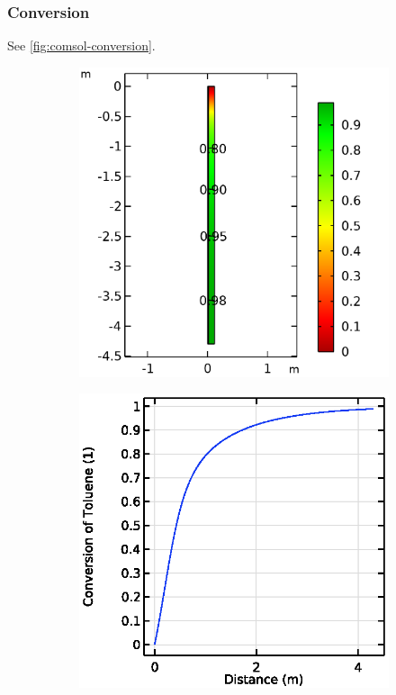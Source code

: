 \subsubsection{Conversion}

See \cref{fig:comsol-conversion}.

\begin{figure}[h]
    \centering

    \begin{subfigure}{0.49\linewidth}
        \includegraphics[width=\linewidth]{figures/conversion-surface.png}
        \caption{}
        \label{fig:comsol-conversion:surface}
    \end{subfigure}
    \begin{subfigure}{0.49\linewidth}
        \includegraphics[width=\linewidth]{figures/conversion-line.eps}
        \caption{}
        \label{fig:comsol-conversion:line}
    \end{subfigure}


\end{figure}
